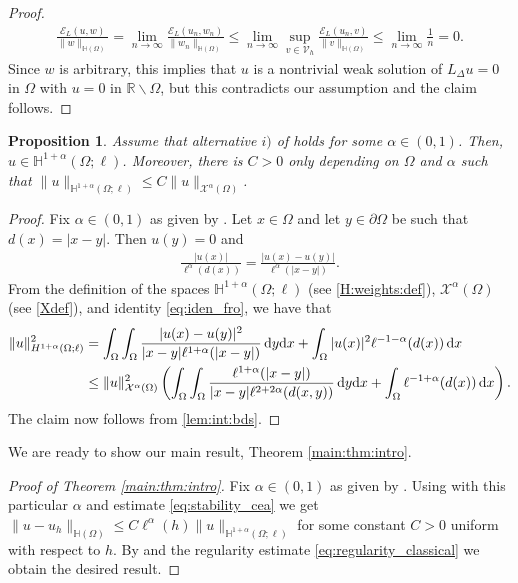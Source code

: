 \documentclass[11 pt]{article}
\newtheorem{proposition}[theorem]{Proposition}
\numberwithin{equation}{section}
\def\R{\mathbb{R}}
\def\cE{\mathcal{E}}
\def\d{\textnormal{d}}
\begin{document}
\begin{proof}
\begin{align*}
    \frac{\cE_{L}(u,w)}{\|w\|_{\mathbb H(\Omega)}}=\lim_{n\to\infty}\frac{\cE_{L}(u_n,w_n)}{\|w_n\|_{\mathbb H(\Omega)}}\leq \lim_{n\to\infty}\sup_{v\in \mathcal V_h}\frac{\cE_{L}(u_n,v)}{\|v\|_{\mathbb H(\Omega)}}\leq \lim_{n\to\infty}\frac{1}{n}=0.
\end{align*}
Since $w$ is arbitrary, this implies that $u$ is a nontrivial weak solution of $L_\Delta u=0$ in $\Omega$ with $u=0$ in $\R\backslash  \Omega$, but this contradicts our assumption and the claim follows. 
\end{proof}


\begin{proposition}\label{prop:more_regularity}
Assume that alternative $i)$ of  holds for some $\alpha\in(0,1)$. Then, $u\in \mathbb H^{1+\alpha}(\Omega;\ell)$. Moreover, there is $C>0$ only depending on $\Omega$ and $\alpha$ such that $\|u\|_{\mathbb H^{1+\alpha}(\Omega;\ell)}\leq C\|u\|_{\mathcal X^{\alpha}(\Omega)}$.
\end{proposition}
%
\begin{proof}
Fix $\alpha\in(0,1)$ as given by . Let $x\in \Omega$ and let $y\in\partial \Omega$ be such that $d(x)=|x-y|$. Then $u(y)=0$ and 
%
\begin{align}\label{eq:iden_fro}
    \frac{|u(x)|}{\ell^{\alpha}(d(x))}=\frac{|u(x)-u(y)|}{\ell^{\alpha}(|x-y|)}.
\end{align}
%
From the definition of the spaces ${\mathbb H}^{1+\alpha}(\Omega;\ell)$ (see \eqref{H:weights:def}), $\mathcal X^\alpha(\Omega)$ (see \eqref{Xdef}), and identity \eqref{eq:iden_fro}, we have that
%
\begin{align*}\notag
    \|u\|^2_{H^{1+\alpha}(\Omega;\ell)}&=\int_{\Omega}\int_{\Omega}\frac{|u(x)-u(y)|^2}{|x-y|\ell^{1+\alpha}(|x-y|)}\, \d{y} \d{x}+\int_{\Omega}|u(x)|^2\ell^{-1-\alpha}(d(x))\,\d{x} \\
    &\leq \|u\|^2_{\mathcal X^{\alpha}(\Omega)}\left(\int_{\Omega}\int_{\Omega}\frac{\ell^{1+\alpha}(|x-y|)}{|x-y|\ell^{2+2\alpha}(d(x,y))}\,\d{y}\d{x}+ \int_{\Omega}\ell^{-1+\alpha}(d(x))\,\d{x}\right). %
\end{align*}
%
The claim now follows from \eqref{lem:int:bds}.
\end{proof}
%


We are ready to show our main result, Theorem \ref{main:thm:intro}.

\begin{proof}[Proof of Theorem \ref{main:thm:intro}]
Fix $\alpha\in(0,1)$ as given by . Using  with this particular $\alpha$ and estimate \eqref{eq:stability_cea} we get $\|u-u_h\|_{\mathbb H(\Omega)}\leq C\ell^{\alpha}(h)\|u\|_{\mathbb{H}^{1+\alpha}(\Omega;\ell)}$ for some constant $C>0$ uniform with respect to $h$. By  and the regularity estimate \eqref{eq:regularity_classical} we obtain the desired result.
\end{proof}
\end{document}
